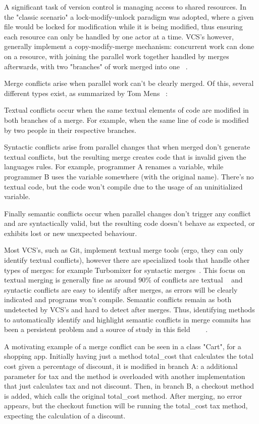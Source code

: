 A significant task of version control is managing access to shared resources.
In the "classic scenario" a lock-modify-unlock paradigm was adopted, where a given file would be locked for modification while it is being modified, thus ensuring each resource can only be handled by one actor at a time. VCS's however, generally implement a copy-modify-merge mechanism: concurrent work can done on a resource, with joining the parallel work together handled by merges afterwards, with two "branches" of work merged into one ~\citep{kn:vers_ott}.

Merge conflicts arise when parallel work can't be clearly merged. Of this, several different types exist, as summarized by Tom Mens ~\citep{kn:tmens}:

Textual conflicts occur when the same textual elements of code are modified in both branches of a merge. For example, when the same line of code is modified by two people in their respective branches.

Syntactic conflicts arise from parallel changes that when merged don't generate textual conflicts, but the resulting merge creates code that is invalid given the languages rules. For example, programmer A renames a variable, while programmer B uses the variable somewhere (with the original name). There's no textual code, but the code won't compile due to the usage of an uninitialized variable.

Finally semantic conflicts occur when parallel changes don't trigger any conflict and are syntactically valid, but the resulting code doesn't behave as expected, or exhibits lost or new unexpected behaviour.

Most VCS's, such as Git, implement textual merge tools (ergo, they can only identify textual conflicts), however there are specialized tools that handle other types of merges: for example Turbomixer for syntactic merges~\citep{kn:tmens}. This focus on textual merging is generally fine as around 90\% of conflicts are textual ~\citep{kn:lcsd} and syntactic conflicts are easy to identify after merges, as errors will be clearly indicated and programs won't compile.
Semantic conflicts remain as both undetected by VCS's and hard to detect after merges. Thus, identifying methods to automatically identify and highlight semantic conflicts in merge commits has been a persistent problem and a source of study in this field~\citep{kn:nuno} ~\citep{kn:leuson} ~\citep{kn:leuson2}.


A motivating example of a merge conflict can be seen in a class "Cart", for a shopping app. Initially having just a method total\_cost that calculates the total cost given a percentage of discount, it is modified in branch A: a additional parameter for tax and the method is overloaded with another implementation that just calculates tax and not discount. Then, in branch B, a checkout method is added, which calls the original total\_cost method. After merging, no error appears, but the checkout function will be running the total\_cost tax method, expecting the calculation of a discount.

